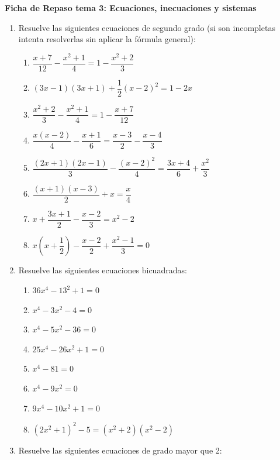 \documentclass[11pt,a4paper]{article}
\begin{document}
\shorthandoff{<>}

\begin{center}
    {\LARGE \textbf{Ficha de Repaso tema 3: Ecuaciones, inecuaciones y sistemas}}\\[0.2cm]
\end{center}

\begin{enumerate}
    \item Resuelve las siguientes ecuaciones de segundo grado (si son incompletas intenta resolverlas sin aplicar la fórmula general):
        \begin{enumerate}
            \item $\dfrac{x+7}{12}-\dfrac{x^2+1}{4}=1-\dfrac{x^2+2}{3}$
            \item $(3x-1)(3x+1)+\dfrac{1}{2}(x-2)^2=1-2x$
            \item $\dfrac{x^2+2}{3} - \dfrac{x^2+1}{4} = 1 - \dfrac{x+7}{12}$
            \item $\dfrac{x(x-2)}{4} - \dfrac{x+1}{6} = \dfrac{x-3}{2} - \dfrac{x-4}{3}$
            \item $\dfrac{(2x+1)(2x-1)}{3} - \dfrac{(x-2)^2}{4} = \dfrac{3x+4}{6} + \dfrac{x^2}{3}$ 
            \item $\dfrac{(x+1)(x-3)}{2} + x = \dfrac{x}{4}$
            \item $x + \dfrac{3x+1}{2} - \dfrac{x-2}{3} = x^2 - 2$
            \item $x\left(x + \dfrac{1}{2}\right) - \dfrac{x-2}{2} + \dfrac{x^2-1}{3} = 0$
        \end{enumerate}
    \item Resuelve las siguientes ecuaciones bicuadradas:
        \begin{enumerate}
            \item $36x^4-13^2+1=0$ 
            \item $x^4 - 3x^2 - 4 = 0$
            \item $x^4 - 5x^2 - 36 = 0$
            \item $25x^4 - 26x^2 + 1 = 0$
            \item $x^4 - 81 = 0$
            \item $x^4 - 9x^2 = 0$
            \item $9x^4 - 10x^2 + 1 = 0$
            \item $(2x^2 + 1)^2 - 5 = (x^2 + 2)(x^2 - 2)$
        \end{enumerate}
    \item Resuelve las siguientes ecuaciones de grado mayor que 2:

\end{enumerate}
\end{document}
